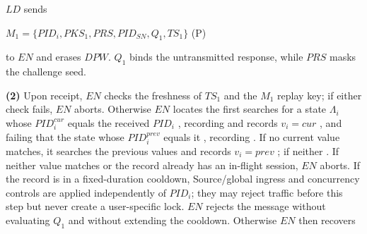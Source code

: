 \documentclass[cmc,article,submit,moreauthors,pdftex]{Definitions/tsp}
\newcounter{protoeq} %
\newenvironment{ceq}{%
  \refstepcounter{protoeq}%
  \par\vspace{-3pt}\setlength{\topsep}{0pt}\setlength{\partopsep}{0pt}\begin{center}%
}{%
  \hspace{0.45em}\textup{(P\theprotoeq)}%
  \end{center}\vspace{-3pt}%
} %
\providecommand{\DIFadd}[1]{{\protect\color{blue} \sf #1}} %
\providecommand{\DIFdel}[1]{{\protect\color{red} \scriptsize #1}} %
\providecommand{\DIFaddbegin}{} %
\providecommand{\DIFaddend}{} %
\providecommand{\DIFdelbegin}{} %
\providecommand{\DIFdelend}{} %
\begin{document}
$LD$ sends
\DIFdelbegin %
\DIFdelend \DIFaddbegin \begin{ceq}
\DIFaddend $M_1=\{PID_i, PKS_1, PRS, PID_{SN}, Q_1, TS_1\}$
\DIFdelbegin %
\DIFdelend \DIFaddbegin \end{ceq}
\DIFaddend to $EN$ and erases $DPW$. $Q_1$ binds the untransmitted response, while $PRS$ masks the challenge seed.

\textbf{(2)} Upon receipt, $EN$ checks the freshness of $TS_1$ and the $M_1$ replay key; if either check fails, $EN$ aborts. Otherwise $EN$ \DIFdelbegin \DIFdel{locates the }\DIFdelend \DIFaddbegin \DIFadd{first searches for a }\DIFaddend state $\Lambda_i$ whose $PID_i^{cur}$ equals the received $PID_i$ \DIFdelbegin \DIFdel{, recording }\DIFdelend \DIFaddbegin \DIFadd{and records }\DIFaddend $v_i=cur$\DIFdelbegin \DIFdel{, and failing that the state whose $PID_i^{prev}$ equals it , recording }\DIFdelend \DIFaddbegin \DIFadd{. If no current value matches, it searches the previous values and records }\DIFaddend $v_i=prev$\DIFdelbegin \DIFdel{; if neither }\DIFdelend \DIFaddbegin \DIFadd{. If neither value }\DIFaddend matches or the record already has an in-flight session, $EN$ aborts. \DIFdelbegin \DIFdel{If the record is in a fixed-duration cooldown, }\DIFdelend \DIFaddbegin \DIFadd{Source/global ingress and concurrency controls are applied independently of $PID_i$; they may reject traffic before this step but never create a user-specific lock. }\DIFaddend $EN$ \DIFdelbegin \DIFdel{rejects the message without evaluating $Q_1$ and without extending the cooldown. Otherwise $EN$ }\DIFdelend \DIFaddbegin \DIFadd{then }\DIFaddend recovers
\end{document}
